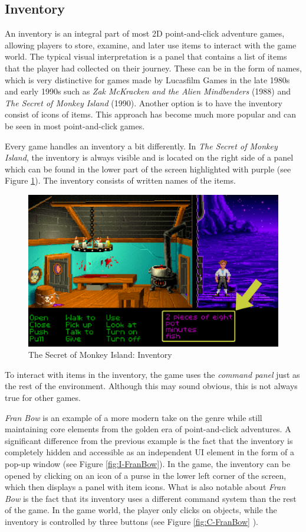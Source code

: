 \subsection{Inventory}
\label{sec:Inventory}
An inventory is an integral part of most 2D point-and-click adventure games, allowing players to store, examine, and later use items to interact with the game world. The typical visual interpretation is a panel that contains a list of items that the player had collected on their journey. These can be in the form of names, which is very distinctive for games made by Lucasfilm Games in the late 1980s and early 1990s such as \textit{Zak McKracken and the Alien Mindbenders} (1988) and \textit{The Secret of Monkey Island} (1990). Another option is to have the inventory consist of icons of items. This approach has become much more popular and can be seen in most point-and-click games.

Every game handles an inventory a bit differently. In \textit{The Secret of Monkey Island}, the inventory is always visible and is located on the right side of a panel which can be found in the lower part of the screen highlighted with purple (see Figure \ref{fig:I-TSoMI}). The inventory consists of written names of the items. 

\begin{figure}[H]
\centering
\includegraphics[width=.8\linewidth]{img/I-TSoMI.png}
\caption{The Secret of Monkey Island: Inventory}
\label{fig:I-TSoMI}
\end{figure}

To interact with items in the inventory, the game uses the \textit{command panel} just as the rest of the environment. Although this may sound obvious, this is not always true for other games. 

\textit{Fran Bow} is an example of a more modern take on the genre while still maintaining core elements from the golden era of point-and-click adventures.  A significant difference from the previous example is the fact that the inventory is completely hidden and accessible as an independent UI element in the form of a pop-up window (see Figure \ref{fig:I-FranBow}). In the game, the inventory can be opened by clicking on an icon of a purse in the lower left corner of the screen, which then displays a panel with item icons. What is also notable about \textit{Fran Bow} is the fact that its inventory uses a different command system than the rest of the game. In the game world, the player only clicks on objects, while the inventory is controlled by three buttons (see Figure \ref{fig:C-FranBow} ). 

